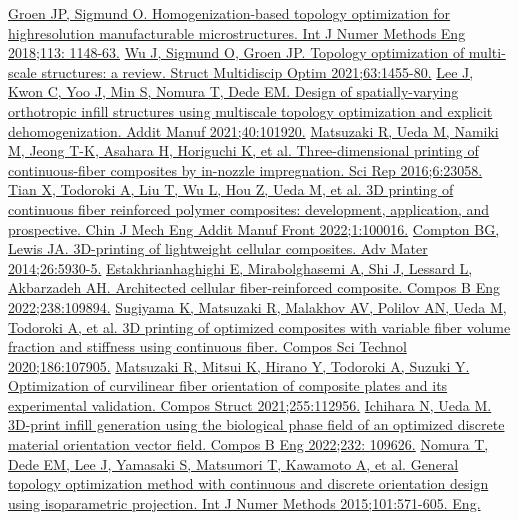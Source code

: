 \documentclass[a4paper,7pt,fleqn]{article}   %
\begin{document}
\begin{multicols}{2}
\begin{thebibliography}{99}
			\href{https://doi.org/10.1002/nme.5575}{Groen JP, Sigmund O. Homogenization-based topology optimization for highresolution manufacturable microstructures. Int J Numer Methods Eng 2018;113: 1148-63.}
			\href{https://doi.org/10.1007/s00158-021-02881-8}{Wu J, Sigmund O, Groen JP. Topology optimization of multi-scale structures: a review. Struct Multidiscip Optim 2021;63:1455-80.}
			\href{https://doi.org/10.1016/j.addma.2021.101920}{Lee J, Kwon C, Yoo J, Min S, Nomura T, Dede EM. Design of spatially-varying orthotropic infill structures using multiscale topology optimization and explicit dehomogenization. Addit Manuf 2021;40:101920.}
			\href{https://doi.org/10.1038/srep23058}{Matsuzaki R, Ueda M, Namiki M, Jeong T-K, Asahara H, Horiguchi K, et al. Three-dimensional printing of continuous-fiber composites by in-nozzle impregnation. Sci Rep 2016;6:23058.}
			\href{https://doi.org/10.1016/j.cjmeam.2022.100016}{Tian X, Todoroki A, Liu T, Wu L, Hou Z, Ueda M, et al. 3D printing of continuous fiber reinforced polymer composites: development, application, and prospective. Chin J Mech Eng Addit Manuf Front 2022;1:100016.}
			\href{https://doi.org/10.1002/adma.201401804}{Compton BG, Lewis JA. 3D-printing of lightweight cellular composites. Adv Mater 2014;26:5930-5.}
			\href{https://doi.org/10.1016/j.compositesb.2022.109894}{Estakhrianhaghighi E, Mirabolghasemi A, Shi J, Lessard L, Akbarzadeh AH. Architected cellular fiber-reinforced composite. Compos B Eng 2022;238:109894.}
			\href{https://doi.org/10.1016/j.compscitech.2019.107905}{Sugiyama K, Matsuzaki R, Malakhov AV, Polilov AN, Ueda M, Todoroki A, et al. 3D printing of optimized composites with variable fiber volume fraction and stiffness using continuous fiber. Compos Sci Technol 2020;186:107905.}
			\href{https://doi.org/10.1016/j.compstruct.2020.112956}{Matsuzaki R, Mitsui K, Hirano Y, Todoroki A, Suzuki Y. Optimization of curvilinear fiber orientation of composite plates and its experimental validation. Compos Struct 2021;255:112956.}
			\href{https://doi.org/10.1016/j.compositesb.2022.109626}{Ichihara N, Ueda M. 3D-print infill generation using the biological phase field of an optimized discrete material orientation vector field. Compos B Eng 2022;232: 109626.}
			\href{https://doi.org/10.1002/nme.4799}{Nomura T, Dede EM, Lee J, Yamasaki S, Matsumori T, Kawamoto A, et al. General topology optimization method with continuous and discrete orientation design using isoparametric projection. Int J Numer Methods 2015;101:571-605. Eng.}

\end{thebibliography}
\end{multicols}
\end{document}
